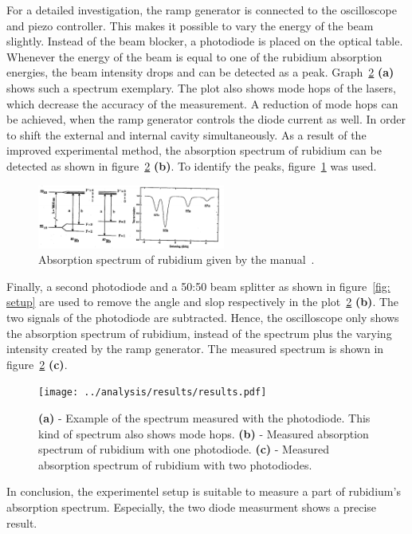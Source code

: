 For a detailed investigation, the ramp generator is connected to the oscilloscope
and piezo controller. This makes it possible to vary the energy of the beam slightly.
Instead of the beam blocker, a photodiode is placed on the
optical table. Whenever the energy of the beam is equal to one of the rubidium
absorption energies, the beam intensity drops and can be detected as a peak.
Graph~\ref{fig: spectrum_measured} \textbf{(a)} shows such a spectrum exemplary.
The plot also shows mode hops of the lasers, which decrease the accuracy of the
measurement. A reduction of mode hops can be achieved, when the ramp generator
controls the diode current as well. In order to shift the external and internal cavity
simultaneously. As a result of the improved experimental method, the absorption
spectrum of rubidium can be detected as shown in figure~\ref{fig: spectrum_measured} \textbf{(b)}.
To identify the peaks, figure~\ref{fig: spectrum_manual} was used.
\begin{figure}
  \centering
  \includegraphics[width = 0.55\textwidth]{./content/images/absorption_spectrum_rubidium.png}
  \caption{Absorption spectrum of rubidium given by the manual~\cite{anleitung60}.}
  \label{fig: spectrum_manual}
\end{figure}
Finally, a second photodiode and a 50:50 beam splitter as shown in figure~\ref{fig: setup}
are used to remove the angle and slop respectively in the plot~\ref{fig: spectrum_measured} \textbf{(b)}. The two signals of
the photodiode are subtracted. Hence, the oscilloscope only shows the
absorption spectrum of rubidium, instead of the spectrum plus the varying intensity created by the
ramp generator. The measured spectrum is shown in figure~\ref{fig: spectrum_measured} \textbf{(c)}.
\begin{figure}
  \centering
  \texttt{[image: ../analysis/results/results.pdf]}
  \caption{\textbf{(a)} - Example of the spectrum measured with the photodiode. This kind of spectrum also
          shows mode hops. \textbf{(b)} - Measured absorption spectrum of rubidium with one photodiode. \textbf{(c)} - Measured absorption spectrum of rubidium with two photodiodes.}
  \label{fig: spectrum_measured}
\end{figure}
In conclusion, the experimentel setup is suitable to measure a part of
rubidium's absorption spectrum. Especially, the two diode measurment shows
a precise result.
